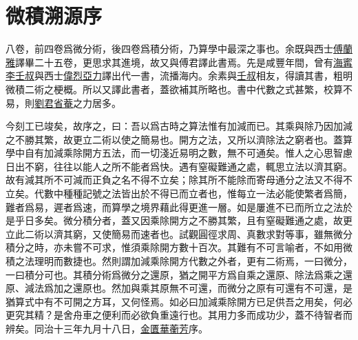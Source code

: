 \chapter {微積溯源序}
\gdef\firstsectiontitle{微積溯源序}
\thispagestyle{fancy}

  八卷，前四卷爲微分術，後四卷爲積分術，乃算學中最深之事也。余既與西士\uline{傅蘭雅}譯畢二十五卷，更思求其進境，故又與傅君譯此書焉。先是咸豐年間，曾有\uline{海寗}\uline{李壬叔}與西士\uline{偉烈亞力}譯出代一書，流播海内。余素與\uline{壬叔}相友，得讀其書，粗明微積二術之梗概。所以又譯此書者，蓋欲補其所略也。書中代數之式甚繁，校算不易，則\uline{劉君省菴}之力居多。

  今刻工已竣矣，故序之，曰：吾以爲古時之算法惟有加減而已。其乘與除乃因加減之不勝其繁，故更立二術以使之簡易也。開方之法，又所以濟除法之窮者也。蓋算學中自有加減乘除開方五法，而一切淺近易明之數，無不可通矣。惟人之心思智慮日出不窮，往往以能人之所不能者爲快。遇有窒礙難通之處，輒思立法以濟其窮。故有減其所不可減而正負之名不得不立矣；除其所不能除而寄母通分之法又不得不立矣。代數中種種記號之法皆出於不得已而立者也，惟每立一法必能使繁者爲簡，難者爲易，遲者爲速，而算學之境界藉此得更進一層。如是屢進不已而所立之法於是乎日多矣。微分積分者，蓋又因乘除開方之不勝其繁，且有窒礙難通之處，故更立此二術以濟其窮，又使簡易而速者也。試觀圓徑求周、真數求對等事，雖無微分積分之時，亦未嘗不可求，惟須乘除開方數十百次。其難有不可言喻者，不如用微積之法理明而數捷也。然則謂加減乘除開方代數之外者，更有二術焉，一曰微分，一曰積分可也。其積分術爲微分之還原，猶之開平方爲自乘之還原、除法爲乘之還原、減法爲加之還原也。然加與乘其原無不可還，而微分之原有可還有不可還，是猶算式中有不可開之方耳，又何怪焉。如必曰加減乘除開方已足供吾之用矣，何必更究其精？是舍舟車之便利而必欲負重遠行也。其用力多而成功少，蓋不待智者而辨矣。同治十三年九月十八日，\uline{金匱}\uline{華蘅芳}序。